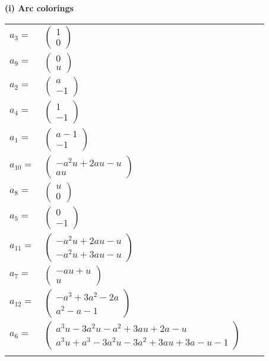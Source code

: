 \documentclass[1p]{elsarticle_modified}
\theoremstyle{definition}
\begin{document}
\flushleft \textbf{(i) Arc colorings}\\
\begin{tabular}{m{7pt} m{180pt} m{7pt} m{180pt} }
\flushright $a_{3}=$&$\begin{pmatrix}1\\0\end{pmatrix}$ \\
\flushright $a_{9}=$&$\begin{pmatrix}0\\u\end{pmatrix}$ \\
\flushright $a_{2}=$&$\begin{pmatrix}a\\-1\end{pmatrix}$ \\
\flushright $a_{4}=$&$\begin{pmatrix}1\\-1\end{pmatrix}$ \\
\flushright $a_{1}=$&$\begin{pmatrix}a-1\\-1\end{pmatrix}$ \\
\flushright $a_{10}=$&$\begin{pmatrix}- a^2 u+2 a u- u\\a u\end{pmatrix}$ \\
\flushright $a_{8}=$&$\begin{pmatrix}u\\0\end{pmatrix}$ \\
\flushright $a_{5}=$&$\begin{pmatrix}0\\-1\end{pmatrix}$ \\
\flushright $a_{11}=$&$\begin{pmatrix}- a^2 u+2 a u- u\\- a^2 u+3 a u- u\end{pmatrix}$ \\
\flushright $a_{7}=$&$\begin{pmatrix}- a u+u\\u\end{pmatrix}$ \\
\flushright $a_{12}=$&$\begin{pmatrix}- a^3+3 a^2-2 a\\a^2- a-1\end{pmatrix}$ \\
\flushright $a_{6}=$&$\begin{pmatrix}a^3 u-3 a^2 u- a^2+3 a u+2 a- u\\a^3 u+a^3-3 a^2 u-3 a^2+3 a u+3 a- u-1\end{pmatrix}$\\&\end{tabular}
\end{document}
